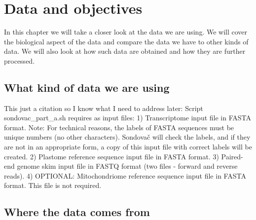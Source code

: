 \chapter[Data and objectives]{Data and objectives}
\label{kap:data_and_objectives}

In this chapter we will take a closer look at the data we are using. We will cover the biological aspect of 
the data and compare the data we have to other kinds of data. We will also look at how such data are obtained 
and how they are further processed. 

\section{What kind of data we are using}
This just a citation so I know what I need to address later:
Script sondovac\_part\_a.sh requires as input files:
1) Transcriptome input file in FASTA format. Note: For technical reasons, the 
   labels of FASTA sequences must be unique numbers (no other characters). 
   Sondovač will check the labels, and if they are not in an appropriate form, 
   a copy of this input file with correct labels will be created.
2) Plastome reference sequence input file in FASTA format.
3) Paired-end genome skim input file in FASTQ format (two files - forward and 
   reverse reads).
4) OPTIONAL: Mitochondriome reference sequence input file in FASTA format.
   This file is not required.
\cite{sondovac}

\section{Where the data comes from}


